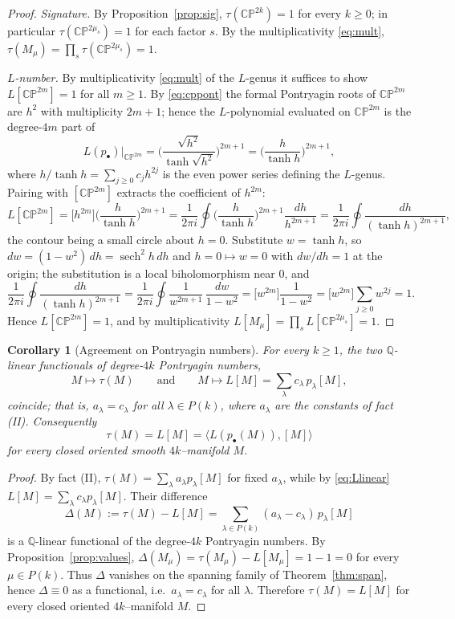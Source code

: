 \documentclass[12pt]{article}
\newtheorem{corollary}{Corollary}
\theoremstyle{definition}
\begin{document}
\begin{proof}
\emph{Signature.}  By Proposition~\ref{prop:sig}, $\tau(\mathbb{CP}^{2k})=1$ for every
$k\ge0$; in particular $\tau(\mathbb{CP}^{2\mu_s})=1$ for each factor $s$.  By the
multiplicativity \eqref{eq:mult}, $\tau(M_\mu)=\prod_s\tau(\mathbb{CP}^{2\mu_s})=1$.

\emph{$L$-number.}  By multiplicativity \eqref{eq:mult} of the $L$-genus it suffices to
show $L[\mathbb{CP}^{2m}]=1$ for all $m\ge 1$.  By \eqref{eq:cppont} the formal
Pontryagin roots of $\mathbb{CP}^{2m}$ are $h^2$ with multiplicity $2m+1$; hence the
$L$-polynomial evaluated on $\mathbb{CP}^{2m}$ is the degree-$4m$ part of
\[
L(p_\bullet)\Big|_{\mathbb{CP}^{2m}}
=\Big(\frac{\sqrt{h^2}}{\tanh\sqrt{h^2}}\Big)^{2m+1}
=\Big(\frac{h}{\tanh h}\Big)^{2m+1},
\]
where $h/\tanh h=\sum_{j\ge 0}c_j h^{2j}$ is the even power series defining the $L$-genus.
Pairing with $[\mathbb{CP}^{2m}]$ extracts the coefficient of $h^{2m}$:
\[
L[\mathbb{CP}^{2m}]=\big[h^{2m}\big]\Big(\frac{h}{\tanh h}\Big)^{2m+1}
=\frac{1}{2\pi i}\oint \Big(\frac{h}{\tanh h}\Big)^{2m+1}\frac{dh}{h^{2m+1}}
=\frac{1}{2\pi i}\oint\frac{dh}{(\tanh h)^{2m+1}},
\]
the contour being a small circle about $h=0$.  Substitute $w=\tanh h$, so
$dw=(1-w^2)\,dh=\operatorname{sech}^2 h\,dh$ and $h=0\mapsto w=0$ with $dw/dh=1$ at the
origin; the substitution is a local biholomorphism near $0$, and
\[
\frac{1}{2\pi i}\oint\frac{dh}{(\tanh h)^{2m+1}}
=\frac{1}{2\pi i}\oint\frac{1}{w^{2m+1}}\,\frac{dw}{1-w^2}
=\big[w^{2m}\big]\frac{1}{1-w^2}
=\big[w^{2m}\big]\sum_{j\ge0}w^{2j}=1.
\]
Hence $L[\mathbb{CP}^{2m}]=1$, and by multiplicativity
$L[M_\mu]=\prod_s L[\mathbb{CP}^{2\mu_s}]=1$.
\end{proof}

\begin{corollary}[Agreement on Pontryagin numbers]\label{cor:agree}
For every $k\ge 1$, the two $\mathbb{Q}$-linear functionals of degree-$4k$ Pontryagin
numbers,
\[
M\longmapsto\tau(M)
\qquad\text{and}\qquad
M\longmapsto L[M]=\sum_\lambda c_\lambda\,p_\lambda[M],
\]
coincide; that is, $a_\lambda=c_\lambda$ for all $\lambda\in P(k)$, where $a_\lambda$ are
the constants of fact \textnormal{(II)}.  Consequently
\[
\tau(M)=L[M]=\big\langle L(p_\bullet(M)),[M]\big\rangle
\]
for every closed oriented smooth $4k$--manifold $M$.
\end{corollary}

\begin{proof}
By fact (II), $\tau(M)=\sum_\lambda a_\lambda p_\lambda[M]$ for fixed $a_\lambda$, while by
\eqref{eq:Llinear} $L[M]=\sum_\lambda c_\lambda p_\lambda[M]$.  Their difference
\[
\Delta(M):=\tau(M)-L[M]=\sum_{\lambda\in P(k)}(a_\lambda-c_\lambda)\,p_\lambda[M]
\]
is a $\mathbb{Q}$-linear functional of the degree-$4k$ Pontryagin numbers.  By
Proposition~\ref{prop:values}, $\Delta(M_\mu)=\tau(M_\mu)-L[M_\mu]=1-1=0$ for every
$\mu\in P(k)$.  Thus $\Delta$ vanishes on the spanning family of
Theorem~\ref{thm:span}, hence $\Delta\equiv 0$ as a functional, i.e.\
$a_\lambda=c_\lambda$ for all $\lambda$.  Therefore $\tau(M)=L[M]$ for every closed
oriented $4k$--manifold $M$.
\end{proof}
\end{document}
